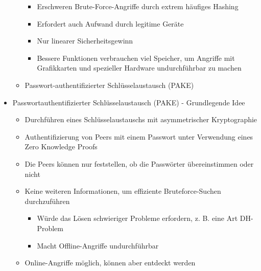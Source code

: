 \documentclass[a4paper]{article}
\begin{document}
\begin{multicols}{3}
\begin{itemize}
\begin{itemize}
                        \begin{itemize}
                            \item
                                  Erschweren Brute-Force-Angriffe durch extrem häufiges Hashing
                            \item
                                  Erfordert auch Aufwand durch legitime Geräte
                            \item
                                  Nur linearer Sicherheitsgewinn
                            \item
                                  Bessere Funktionen verbrauchen viel Speicher, um Angriffe mit
                                  Grafikkarten und spezieller Hardware undurchführbar zu machen
                        \end{itemize}
                  \item
                        Passwort-authentifizierter Schlüsselaustausch (PAKE)
              \end{itemize}
        \item
              Passwortauthentifizierter Schlüsselaustausch (PAKE) - Grundlegende
              Idee

              \begin{itemize}
                  \item
                        Durchführen eines Schlüsselaustauschs mit asymmetrischer
                        Kryptographie
                  \item
                        Authentifizierung von Peers mit einem Passwort unter Verwendung
                        eines Zero Knowledge Proofs
                  \item
                        Die Peers können nur feststellen, ob die Passwörter übereinstimmen
                        oder nicht
                  \item
                        Keine weiteren Informationen, um effiziente Bruteforce-Suchen
                        durchzuführen

                        \begin{itemize}
                            \item
                                  Würde das Lösen schwieriger Probleme erfordern, z. B. eine Art
                                  DH-Problem
                            \item
                                  Macht Offline-Angriffe undurchführbar
                        \end{itemize}
                  \item
                        Online-Angriffe möglich, können aber entdeckt werden
              \end{itemize}
    \end{itemize}



\end{multicols}
\end{document}
